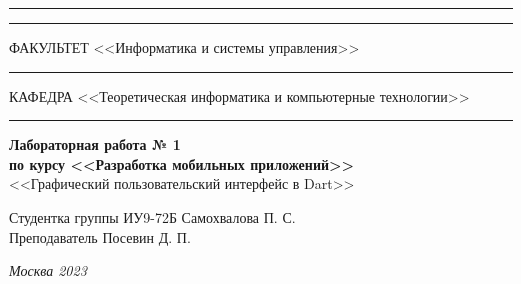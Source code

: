 \documentclass[a4paper, 14pt]{extarticle}
\begin{document}
\begin{titlepage}
\vspace{-25pt}
\hspace{-35pt}\rule{\textwidth}{2.3pt}

\vspace*{-20.3pt}
\hspace{-35pt}\rule{\textwidth}{0.4pt}

\vspace{1.5ex}
\hspace{-35pt} \noindent \small ФАКУЛЬТЕТ\hspace{80pt} <<Информатика и системы управления>>

\vspace*{-16pt}
\hspace{47pt}\rule{0.83\textwidth}{0.4pt}

\vspace{0.5ex}
\hspace{-35pt} \noindent \small КАФЕДРА\hspace{50pt} <<Теоретическая информатика и компьютерные технологии>>

\vspace*{-16pt}
\hspace{30pt}\rule{0.866\textwidth}{0.4pt}
  
\vspace{11em}

\begin{center}
\Large {\bf Лабораторная работа № 1} \\
\large {\bf по курсу <<Разработка мобильных приложений>>} \\
\large <<Графический пользовательский интерфейс в Dart>>
\end{center}\normalsize

\vspace{8em}


\begin{flushright}
  {Студентка группы ИУ9-72Б Самохвалова П. С. \hspace*{15pt}\\
  \vspace{2ex}
  Преподаватель Посевин Д. П.\hspace*{15pt}}
\end{flushright}

\bigskip

\vfill
 

\begin{center}
\textsl{Москва 2023}
\end{center}
\end{titlepage}
\end{document}
